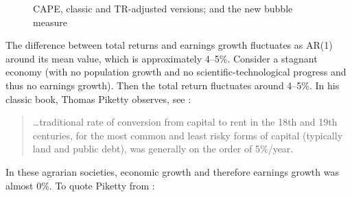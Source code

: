 \documentclass[12pt]{amsart}
\theoremstyle{definition}
\begin{document}
\begin{figure}[t]
\caption{CAPE, classic and TR-adjusted versions; and the new bubble measure}
\label{fig:cape}
\end{figure}

The difference between total returns and earnings growth fluctuates as AR(1) around its mean value, which is approximately 4--5\%. Consider a stagnant economy (with no population growth and no scientific-technological progress and thus no earnings growth). Then the total return fluctuates around 4--5\%. In his classic book, Thomas Piketty observes, see \cite[p.206]{Capital}:

\begin{quote}
\ldots traditional rate of conversion from capital to rent in the 18th and 19th centuries, for the most common and least risky forms of capital (typically land and public debt), was generally on the order of 5\%/year.
\end{quote}

In these agrarian societies, economic growth and therefore earnings growth was almost 0\%. To quote Piketty from \cite[p.353]{Capital}:
\end{document}
